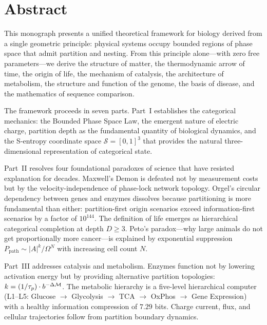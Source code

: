 
\chapter*{Abstract}

This monograph presents a unified theoretical framework for biology derived from a single geometric
principle: physical systems occupy bounded regions of phase space that admit partition and nesting.
From this principle alone---with zero free parameters---we derive the structure of matter, the
thermodynamic arrow of time, the origin of life, the mechanism of catalysis, the architecture of
metabolism, the structure and function of the genome, the basis of disease, and the mathematics
of sequence comparison.

The framework proceeds in seven parts. Part~I establishes the categorical mechanics: the Bounded
Phase Space Law, the emergent nature of electric charge, partition depth as the fundamental
quantity of biological dynamics, and the S-entropy coordinate space $\mathcal{S} = [0,1]^3$ that
provides the natural three-dimensional representation of categorical state.

Part~II resolves four foundational paradoxes of science that have resisted explanation for
decades. Maxwell's Demon is defeated not by measurement costs but by the velocity-independence
of phase-lock network topology. Orgel's circular dependency between genes and enzymes dissolves
because partitioning is more fundamental than either: partition-first origin scenarios exceed
information-first scenarios by a factor of $10^{144}$. The definition of life emerges as
hierarchical categorical completion at depth $D \geq 3$. Peto's paradox---why large animals do
not get proportionally more cancer---is explained by exponential suppression $P_{\mathrm{path}}
\sim |A|^k / \Omega^N$ with increasing cell count $N$.

Part~III addresses catalysis and metabolism. Enzymes function not by lowering activation energy
but by providing alternative partition topologies: $k = (1/\tau_p) \cdot b^{-\Delta\mathcal{M}}$.
The metabolic hierarchy is a five-level hierarchical computer (L1--L5: Glucose $\to$ Glycolysis
$\to$ TCA $\to$ OxPhos $\to$ Gene Expression) with a healthy information compression of
$7.29$ bits. Charge current, flux, and cellular trajectories follow from partition boundary
dynamics.

